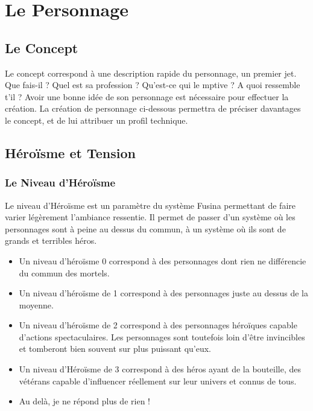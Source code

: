 \chapter{Le Personnage}

\begin{multicols}{2}

\section{Le Concept}

Le concept correspond à une description rapide du personnage, un premier jet. Que fais-il ? Quel est sa profession ? Qu'est-ce qui le mptive ? A quoi ressemble t'il ? Avoir une bonne idée de son personnage est nécessaire pour effectuer la création. La création de personnage ci-dessous permettra de préciser davantages le concept, et de lui attribuer un profil technique.

\section{Héroïsme et Tension}

\subsection{Le Niveau d'Héroïsme}

Le niveau d'Héroïsme est un paramètre du système Fusina permettant de faire varier légèrement l'ambiance ressentie. Il permet de passer d'un système où les personnages sont à peine au dessus du commun, à un système où ils sont de grands et terribles héros.

\begin{itemize}
\item Un niveau d'héroïsme 0 correspond à des personnages dont rien ne différencie du commun des mortels. 
\item Un niveau d'héroïsme de 1 correspond à des personnages juste au dessus de la moyenne. 
\item Un niveau d'héroïsme de 2 correspond à des personnages héroïques capable d'actions spectaculaires. Les personnages sont toutefois loin d'être invincibles et tomberont bien souvent sur plus puissant qu'eux. 
\item Un niveau d'Héroïsme de 3 correspond à des héros ayant de la bouteille, des vétérans capable d'influencer réellement sur leur univers et connus de tous.
\item Au delà, je ne répond plus de rien !
\end{itemize}


\end{multicols}

